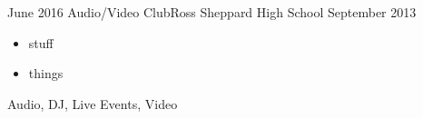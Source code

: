 
\begin{experiences}
  \experience
    {June 2016}   {Audio/Video Club}{Ross Sheppard High School}{}
    {September 2013} {
                      \begin{itemize}
                        \item stuff
                        \item things
                      \end{itemize}
                    }
                    {
                        Audio,
                        DJ,
                        Live Events,
                        Video
                    }

\end{experiences}